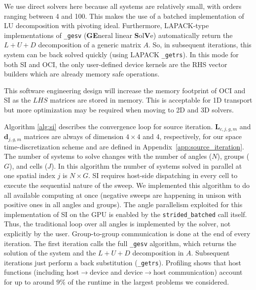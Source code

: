We use direct solvers here because all systems are relatively small, with orders ranging between 4 and 100.
This makes the use of a batched implementation of LU decomposition with pivoting ideal.
Furthermore, LAPACK-type implementations of \texttt{\_gesv} (\textbf{GE}neral linear \textbf{S}ol\textbf{V}e)  automatically return the $L+U+D$ decomposition of a generic matrix $A$.
So, in subsequent iterations, this system can be back solved quickly (using LAPACK \texttt{\_getrs}).
In this mode for both SI and OCI, the only user-defined device kernels are the RHS vector builders which are already memory safe operations.

This software engineering design will increase the memory footprint of OCI and SI as the $LHS$ matrices are stored in memory.
This is acceptable for 1D transport but more optimization may be required when moving to 2D and 3D solvers.

Algorithm \ref{alg:si} describes the convergence loop for source iteration.
$\mathbf{L}_{c,j,g,m}$ and $\bm{d}_{j,g,m}$ matrices are always of dimension $4\times 4$ and 4, respectively, for our space time-discretization scheme and are defined in Appendix~\ref{app:source_iteration}.
The number of systems to solve changes with the number of angles ($N$), groups ($G$), and cells ($J$).
In this algorithm the number of systems solved in parallel at one spatial index $j$ is $N \times G$.
SI requires host-side dispatching in every cell to execute the sequential nature of the sweep.
We implemented this algorithm to do all available computing at once (negative sweeps are happening in unison with positive ones in all angles and groups).
The angle parallelism exploited for this implementation of SI on the GPU is enabled by the \texttt{strided\_batched} call itself.
Thus, the traditional loop over all angles is implemented by the solver, not explicitly by the user.
Group-to-group communication is done at the end of every iteration.
The first iteration calls the full \texttt{\_gesv} algorithm, which returns the solution of the system and the $L+U+D$ decomposition in $A$.
Subsequent iterations just perform a back substitution (\texttt{\_getrs}).
Profiling shows that host functions (including host$\rightarrow$device and device$\rightarrow$host communication) account for up to around $9\%$ of the runtime in the largest problems we considered.

